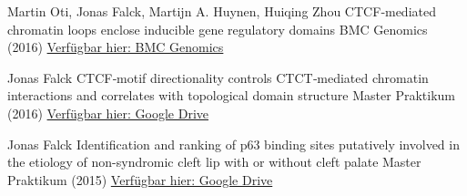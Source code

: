 

\begin{cventries}

\cventry
  {Martin Oti, Jonas Falck, Martijn A. Huynen, Huiqing Zhou} %
  {CTCF‑mediated chromatin loops enclose inducible gene regulatory domains} %
  {BMC Genomics (2016)} %
  {\href{https://bmcgenomics.biomedcentral.com/articles/10.1186/s12864-016-2516-6}{Verfügbar hier: BMC Genomics}}
  {
    \vspace{-2cm}
  }

\cventry
  {Jonas Falck} %
  {CTCF‑motif directionality controls CTCT‑mediated chromatin interactions and correlates
  with topological domain structure} %
  {Master Praktikum (2016)} %
  {\href{https://drive.google.com/file/d/1fE28UxBNoNXvjtaJWrduGhyCLluwIuqX}{Verfügbar hier: Google Drive}} %
  {
    \vspace{-2cm}
  }

\cventry
{Jonas Falck} %
{Identification and ranking of p63 binding sites putatively involved in the etiology of non-syndromic cleft lip with or without cleft palate} %
{Master Praktikum (2015)} %
{\href{https://drive.google.com/file/d/1oTAbdeJxjvjaEwvUDPoQi8nnGD8l52i_}{Verfügbar hier: Google Drive}} %
{
  \vspace{-2cm}
}

\end{cventries}
